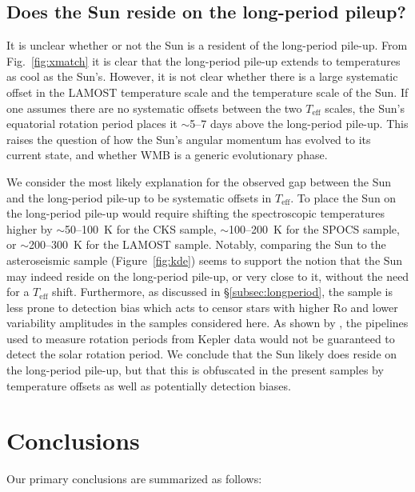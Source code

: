 \documentclass[linenumbers,trackchanges,twocolumn]{aastex631}
\newcommand{\teff}{\ensuremath{T_{\mathrm{eff}}}\xspace}
\begin{document}
\subsection{Does the Sun reside on the long-period pileup?} \label{subsec:thesun}

It is unclear whether or not the Sun is a resident of the long-period pile-up. From Fig.~\ref{fig:xmatch} it is clear that the long-period pile-up extends to temperatures as cool as the Sun's. However, it is not clear whether there is a large systematic offset in the LAMOST temperature scale and the temperature scale of the Sun. If one assumes there are no systematic offsets between the two \teff scales, the Sun's equatorial rotation period places it $\sim$5--7 days above the long-period pile-up. This raises the question of how the Sun's angular momentum has evolved to its current state, and whether WMB is a generic evolutionary phase. 

We consider the most likely explanation for the observed gap between the Sun and the long-period pile-up to be systematic offsets in \teff. To place the Sun on the long-period pile-up would require shifting the spectroscopic temperatures higher by $\sim$50--100~K for the CKS sample, $\sim$100--200~K for the SPOCS sample, or $\sim$200--300~K for the LAMOST sample. Notably, comparing the Sun to the \citet{Hall2021} asteroseismic sample (Figure~\ref{fig:kde}) seems to support the notion that the Sun may indeed reside on the long-period pile-up, or very close to it, without the need for a \teff shift. Furthermore, as discussed in \S\ref{subsec:longperiod}, the \citet{Hall2021} sample is less prone to detection bias which acts to censor stars with higher Ro and lower variability amplitudes in the samples considered here. As shown by \citet{Aigrain2015}, the pipelines used to measure rotation periods from Kepler data would not be guaranteed to detect the solar rotation period. We conclude that the Sun likely does reside on the long-period pile-up, but that this is obfuscated in the present samples by temperature offsets as well as potentially detection biases.

\section{Conclusions} \label{sec:conclusions}

Our primary conclusions are summarized as follows:
\end{document}
